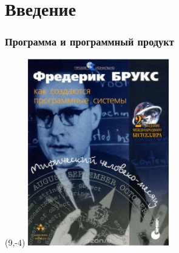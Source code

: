 \documentclass{../mcsslides}
\begin{document}
    \section{Введение}

    \begin{frame}
        \frametitle{Программа и программный продукт}
        \begin{textblock}{2}(9,-4)
            \includegraphics[width=\textwidth]{brooksCover}
        \end{textblock}
    \end{frame}
\end{document}
